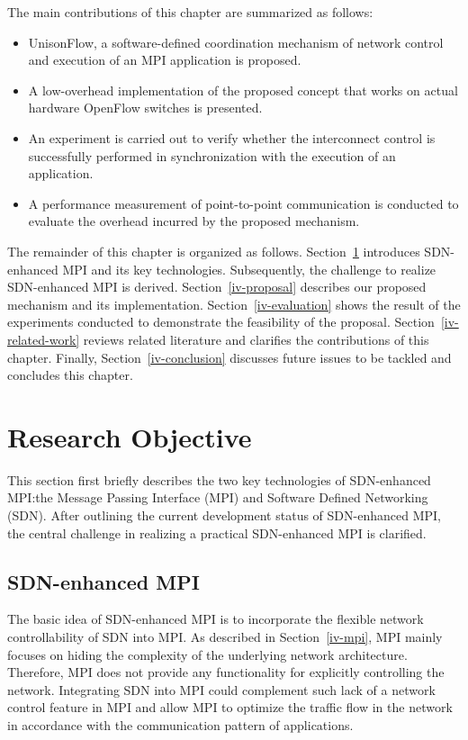 The main contributions of this chapter are summarized as follows:

\begin{itemize}
\item
  UnisonFlow, a software-defined coordination mechanism of network
  control and execution of an MPI application is proposed.
\item
  A low-overhead implementation of the proposed concept that works on
  actual hardware OpenFlow switches is presented.
\item
  An experiment is carried out to verify whether the interconnect
  control is successfully performed in synchronization with the
  execution of an application.
\item
  A performance measurement of point-to-point communication is conducted
  to evaluate the overhead incurred by the proposed mechanism.
\end{itemize}

The remainder of this chapter is organized as follows.
Section~\ref{iv-objective} introduces SDN-enhanced MPI and its key
technologies. Subsequently, the challenge to realize SDN-enhanced MPI is
derived. Section~\ref{iv-proposal} describes our proposed mechanism and its
implementation. Section~\ref{iv-evaluation} shows the result of the experiments
conducted to demonstrate the feasibility of the proposal.
Section~\ref{iv-related-work} reviews related literature and clarifies the
contributions of this chapter. Finally, Section~\ref{iv-conclusion} discusses
future issues to be tackled and concludes this chapter.

\section{Research Objective}\label{iv-objective}

This section first briefly describes the two key technologies of
SDN-enhanced MPI:\@ the Message Passing Interface (MPI) and Software
Defined Networking (SDN). After outlining the current development status
of SDN-enhanced MPI, the central challenge in realizing a practical
SDN-enhanced MPI is clarified.

\subsection{SDN-enhanced MPI}\label{iv-sdn-mpi}

The basic idea of SDN-enhanced MPI is to incorporate the flexible
network controllability of SDN into MPI\@. As described in
Section~\ref{iv-mpi}, MPI mainly focuses on hiding the
complexity of the underlying network architecture. Therefore, MPI does not
provide any functionality for explicitly controlling the network. Integrating
SDN into MPI could complement such lack of a network control feature in MPI
and allow MPI to optimize the traffic flow in the network in accordance with
the communication pattern of applications.

